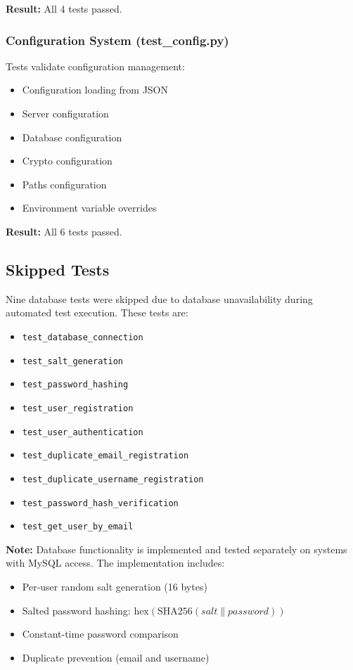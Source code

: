 \documentclass[runningheads]{llncs}
\begin{document}
\textbf{Result:} All 4 tests passed.

\subsubsection{Configuration System (test\_config.py)}

Tests validate configuration management:
\begin{itemize}
    \item Configuration loading from JSON
    \item Server configuration
    \item Database configuration
    \item Crypto configuration
    \item Paths configuration
    \item Environment variable overrides
\end{itemize}

\textbf{Result:} All 6 tests passed.

\subsection{Skipped Tests}

Nine database tests were skipped due to database unavailability during automated test execution. These tests are:

\begin{itemize}
    \item \texttt{test\_database\_connection}
    \item \texttt{test\_salt\_generation}
    \item \texttt{test\_password\_hashing}
    \item \texttt{test\_user\_registration}
    \item \texttt{test\_user\_authentication}
    \item \texttt{test\_duplicate\_email\_registration}
    \item \texttt{test\_duplicate\_username\_registration}
    \item \texttt{test\_password\_hash\_verification}
    \item \texttt{test\_get\_user\_by\_email}
\end{itemize}

\textbf{Note:} Database functionality is implemented and tested separately on systems with MySQL access. The implementation includes:
\begin{itemize}
    \item Per-user random salt generation (16 bytes)
    \item Salted password hashing: $\text{hex}(\text{SHA256}(salt \| password))$
    \item Constant-time password comparison
    \item Duplicate prevention (email and username)
\end{itemize}
\end{document}
